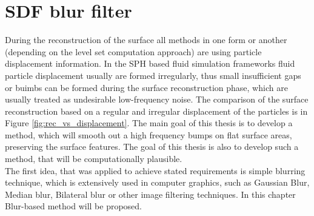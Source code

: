 \chapter{SDF blur filter}
During the reconstruction of the surface all methods in one form or another (depending on the level set computation approach) are using particle displacement information. In the SPH based fluid simulation frameworks fluid particle displacement usually are formed irregularly, thus small insufficient gaps or buimbs can be formed during the surface reconstruction phase, which are usually treated as undesirable low-frequency noise. The comparison of the surface reconstruction based on a regular and irregular displacement of the particles is in Figure \ref{fig:rec_vs_displacement}.
The main goal of this thesis is to develop a method, which will smooth out a high frequency bumps on flat surface areas, preserving the surface features. The goal of this thesis is also to develop such a method, that will be computationally plausible.\\
The first idea, that was applied to achieve stated requirements is simple blurring technique, which is extensively used in computer graphics, such as Gaussian Blur, Median blur, Bilateral blur or other image filtering techniques. In this chapter Blur-based method will be proposed. 
